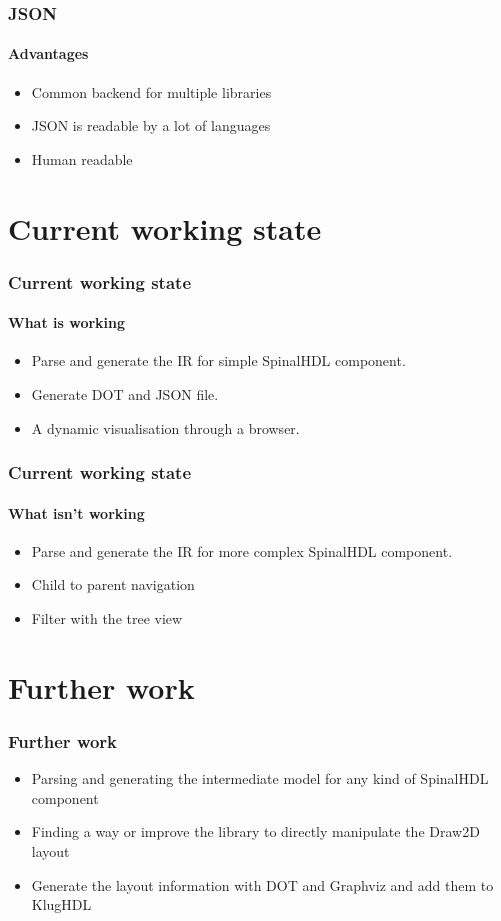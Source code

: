 \documentclass[11pt, handout]{beamer}
\begin{document}
\begin{frame}
  \frametitle{JSON}
  \framesubtitle{Advantages}
  \begin{itemize}
  \item Common backend for multiple libraries
  \item JSON is readable by a lot of languages
  \item Human readable
  \end{itemize}
\end{frame}

\section{Current working state}

\begin{frame}
  \frametitle{Current working state}
  \framesubtitle{What is working}
  \begin{itemize}
  \item Parse and generate the IR for simple SpinalHDL component.
  \item Generate DOT and JSON file.
  \item A dynamic visualisation through a browser.
  \end{itemize}
\end{frame}

\begin{frame}
  \frametitle{Current working state}
  \framesubtitle{What isn't working}
  \begin{itemize}
  \item Parse and generate the IR for more complex SpinalHDL component.
  \item Child to parent navigation
  \item Filter with the tree view
  \end{itemize}
\end{frame}

\section{Further work}

\begin{frame}
  \frametitle{Further work}
  \begin{itemize}
  \item Parsing and generating the intermediate model for any kind of SpinalHDL
    component
  \item Finding a way or improve the library to directly manipulate the Draw2D
    layout
  \item Generate the layout information with DOT and Graphviz and add them to
    KlugHDL
  \end{itemize}
\end{frame}
\end{document}
